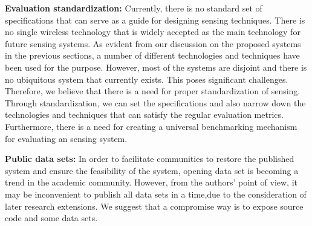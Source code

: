 \textbf{Evaluation standardization:} Currently, there is no standard set of specifications that can serve as a guide for designing sensing techniques. There is no single wireless technology that is widely accepted as the main technology for future sensing systems. As evident from our discussion on the proposed systems in the previous sections, a number of different technologies and techniques have been used for the purpose. However, most of the systems are disjoint and there is no ubiquitous system that currently exists. This poses significant challenges. Therefore, we believe that there is a need for proper standardization of sensing. Through standardization, we can set the specifications and also narrow down the technologies and techniques that can satisfy the regular evaluation metrics. Furthermore, there is a need for creating a universal benchmarking mechanism for evaluating an sensing system.

\textbf{Public data sets: }In order to facilitate communities to restore the published system and ensure the feasibility of the system, opening data set is becoming a trend in the academic community. However, from the authors' point of view, it may be inconvenient to publish all data sets in a time,due to the consideration of later research extensions. We suggest that a compromise way is to expose source code and some data sets.
